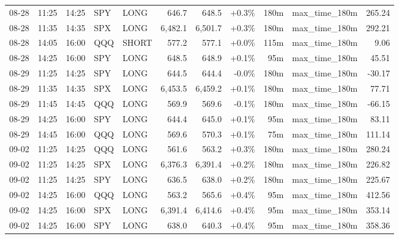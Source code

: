 \documentclass[11pt,a4paper,twoside]{article}
\begin{document}
\begin{center}
\begin{longtable}{>{\color{txtmain}}l l l l l r r r r >{\color{txtmain}}l r}
08-28 & 11:25 & 14:25 & SPY & LONG & 646.7 & 648.5 & \textcolor{wingreen}{+0.3\%} & 180m & max\_time\_180m & \textcolor{wingreen}{265.24} \\
08-28 & 11:35 & 14:35 & SPX & LONG & 6,482.1 & 6,501.7 & \textcolor{wingreen}{+0.3\%} & 180m & max\_time\_180m & \textcolor{wingreen}{292.21} \\
08-28 & 14:05 & 16:00 & QQQ & SHORT & 577.2 & 577.1 & \textcolor{wingreen}{+0.0\%} & 115m & max\_time\_180m & \textcolor{wingreen}{9.06} \\
08-28 & 14:25 & 16:00 & SPY & LONG & 648.5 & 648.9 & \textcolor{wingreen}{+0.1\%} & 95m & max\_time\_180m & \textcolor{wingreen}{45.51} \\
08-29 & 11:25 & 14:25 & SPY & LONG & 644.5 & 644.4 & \textcolor{lossred}{-0.0\%} & 180m & max\_time\_180m & \textcolor{lossred}{-30.17} \\
08-29 & 11:35 & 14:35 & SPX & LONG & 6,453.5 & 6,459.2 & \textcolor{wingreen}{+0.1\%} & 180m & max\_time\_180m & \textcolor{wingreen}{77.71} \\
08-29 & 11:45 & 14:45 & QQQ & LONG & 569.9 & 569.6 & \textcolor{lossred}{-0.1\%} & 180m & max\_time\_180m & \textcolor{lossred}{-66.15} \\
08-29 & 14:25 & 16:00 & SPY & LONG & 644.4 & 645.0 & \textcolor{wingreen}{+0.1\%} & 95m & max\_time\_180m & \textcolor{wingreen}{83.11} \\
08-29 & 14:45 & 16:00 & QQQ & LONG & 569.6 & 570.3 & \textcolor{wingreen}{+0.1\%} & 75m & max\_time\_180m & \textcolor{wingreen}{111.14} \\
09-02 & 11:25 & 14:25 & QQQ & LONG & 561.6 & 563.2 & \textcolor{wingreen}{+0.3\%} & 180m & max\_time\_180m & \textcolor{wingreen}{280.24} \\
09-02 & 11:25 & 14:25 & SPX & LONG & 6,376.3 & 6,391.4 & \textcolor{wingreen}{+0.2\%} & 180m & max\_time\_180m & \textcolor{wingreen}{226.82} \\
09-02 & 11:25 & 14:25 & SPY & LONG & 636.5 & 638.0 & \textcolor{wingreen}{+0.2\%} & 180m & max\_time\_180m & \textcolor{wingreen}{225.67} \\
09-02 & 14:25 & 16:00 & QQQ & LONG & 563.2 & 565.6 & \textcolor{wingreen}{+0.4\%} & 95m & max\_time\_180m & \textcolor{wingreen}{412.56} \\
09-02 & 14:25 & 16:00 & SPX & LONG & 6,391.4 & 6,414.6 & \textcolor{wingreen}{+0.4\%} & 95m & max\_time\_180m & \textcolor{wingreen}{353.14} \\
09-02 & 14:25 & 16:00 & SPY & LONG & 638.0 & 640.3 & \textcolor{wingreen}{+0.4\%} & 95m & max\_time\_180m & \textcolor{wingreen}{358.36} \\

\end{longtable}
\end{center}
\end{document}
